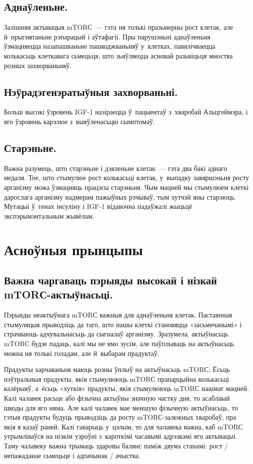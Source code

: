 \subsection{Аднаўленьне.}
Залішняя актывацыя mTORС~--- гэта ня толькі празьмерны рост клетак, але й~прыгнятаньне рэпарацый і аўтафагіі. Пры парушэньні аднаўленьня ўзмацняецца назапашваньне пашкоджваньняў у~клетках, павялічваецца колькасьць клеткавага сьмецьця, што зьяўляецца асновай разьвіцьця мноства розных захворваньняў.

\subsection{Нэўрадэгенэратыўныя захворваньні.}
Больш высокі ўзровень IGF-1 назіраецца ў~пацыентаў з~хваробай Альцгеймэра, і яго ўзровень карэлюе з~выяўленасьцю сымптомаў.

\subsection{Старэньне.}
Важна разумець, што старэньне і дзяленьне клетак~--- гэта два бакі аднаго медаля. Тое, што стымулюе рост колькасьці клетак, у~выпадку завяршэньня росту арганізму можа ўзмацняць працэсы старэньня. Чым мацней мы стымулюем клеткі дарослага арганізму надмерам пажыўных рэчываў, тым хутчэй яны старэюць. Мутацыі ў~генах інсуліну і IGF-1 відавочна падаўжалі жыцьцё экспэрымэнтальным жывёлам.

\section{Асноўныя прынцыпы}

\subsection{Важна чаргаваць пэрыяды высокай і нізкай mTORС-ак\-тыў\-нась\-ці.}
Пэрыяды неактыўнага mTORС важныя для аднаўленьня клетак. Пастаянная стымуляцыя прыводзіць да таго, што нашы клеткі становяцца «засьмечанымі» і страчваюць адчувальнасьць да сыгналаў арганізму. Зразумела, актыўнасьць mTORС будзе падаць, калі мы не ямо зусім, але паўплываць на актыўнасьць можна ня толькі голадам, але й~выбарам прадуктаў.

Прадукты харчаваньня маюць розны ўплыў на актыўнасьць mTORС. Ёсьць нэўтральныя прадукты, якія стымулююць mTORС прапарцыйна колькасьці калёрыяў, а~ёсьць «хуткія» прадукты, якія стымулююць mTORС нашмат мацней. Калі чалавек расьце або фізычна актыўны значную частку дня, то асаблівай шкоды для яго няма. Але калі чалавек мае меншую фізычную актыўнасьць, то гэтыя прадукты будуць прыводзіць да росту mTORС-залежных хваробаў, пра якія я казаў раней. Калі гаварыць у~цэлым, то для чалавека важна, каб mTORС утрымліваўся на нізкім узроўні з~кароткімі часавымі адрэзкамі яго актывацыі. Таму чалавеку важна трымаць здаровы балянс паміж двума станамі: рост / непажаданае сьмецьце і адпачынак / ачыстка.

